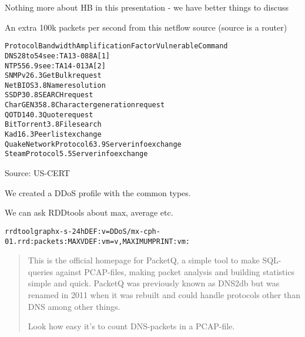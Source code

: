 \documentclass[20pt,landscape,a4paper,footrule]{foils}
\begin{document}
{\footnotesize Nothing more about HB in this presentation - we have better things to discuss}




{\small{}}





\centerline{An extra 100k packets per second from this netflow source (source is a router)}



\begin{alltt}\small
Protocol   Bandwidth Amplification Factor        Vulnerable Command
DNS        28 to 54          see: TA13-088A [1]
NTP        556.9             see: TA14-013A [2]
SNMPv2       6.3             GetBulk request
NetBIOS      3.8             Name resolution
SSDP        30.8             SEARCH request
CharGEN    358.8             Character generation request
QOTD       140.3             Quote request
BitTorrent   3.8             File search
Kad         16.3             Peer list exchange
Quake Network Protocol 63.9  Server info exchange
Steam Protocol  5.5          Server info exchange
\end{alltt}

Source: US-CERT\\




We created a DDoS profile with the common types.

We can ask RDDtools about max, average etc.
\begin{alltt}\footnotesize
rrdtool graph x -s -24h DEF:v=DDoS/mx-cph-01.rrd:packets:MAX VDEF:vm=v,MAXIMUM PRINT:vm:%.lf
\end{alltt}




\begin{quote}
This is the official homepage for PacketQ, a simple tool to make SQL-queries against PCAP-files, making packet analysis and building statistics simple and quick. PacketQ was previously known as DNS2db but was renamed in 2011 when it was rebuilt and could handle protocols other than DNS among other things.

Look how easy it's to count DNS-packets in a PCAP-file.
\end{quote}
\end{document}
